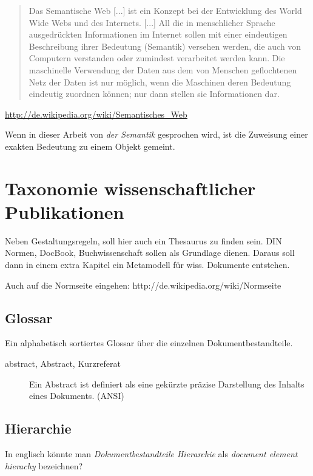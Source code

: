 \begin{quote}Das Semantische Web [...] ist ein Konzept bei der Entwicklung des World Wide Webs und des 
Internets. [...] All die in menschlicher Sprache ausgedrückten Informationen im Internet sollen mit
einer eindeutigen Beschreibung ihrer Bedeutung (Semantik) versehen werden, die auch von Computern 
verstanden oder zumindest verarbeitet werden kann. Die maschinelle Verwendung der Daten aus dem von 
Menschen geflochtenen Netz der Daten ist nur möglich, wenn die Maschinen deren Bedeutung eindeutig 
zuordnen können; nur dann stellen sie Informationen dar.
\end{quote}
\url{http://de.wikipedia.org/wiki/Semantisches_Web}

Wenn in dieser Arbeit von \emph{der Semantik} gesprochen wird, ist die Zuweisung einer
exakten Bedeutung zu einem Objekt gemeint.

\section{Taxonomie wissenschaftlicher Publikationen}

Neben Gestaltungsregeln, soll hier auch ein Thesaurus zu finden sein.
DIN Normen, DocBook, Buchwissenschaft sollen als Grundlage dienen.
Daraus soll dann in einem extra Kapitel ein Metamodell für wiss. Dokumente
entstehen.

Auch auf die Normseite eingehen: http://de.wikipedia.org/wiki/Normseite

\subsection{Glossar}

Ein alphabetisch sortiertes Glossar über die einzelnen Dokumentbestandteile.

\begin{multicols}{2}
  \begin{description}
    \item[abstract, Abstract, Kurzreferat]
    Ein Abstract ist definiert als eine gekürzte präzise Darstellung des Inhalts eines Dokuments. (ANSI)
  \end{description}
\end{multicols}

\subsection{Hierarchie}

In englisch könnte man \emph{Dokumentbestandteile Hierarchie} als
\emph{document element hierachy} bezeichnen?


